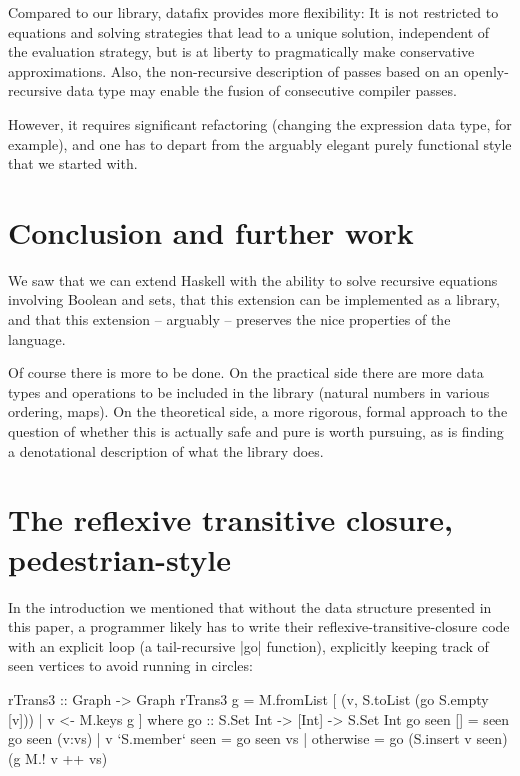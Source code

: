 \documentclass[manuscript,screen,acmsmall,nonacm]{acmart}
\begin{document}
Compared to our library, datafix provides more flexibility: It is not restricted to equations and solving strategies that lead to a unique solution, independent of the evaluation strategy, but is at liberty to pragmatically make conservative approximations. Also, the non-recursive description of passes based on an openly-recursive data type may enable the fusion of consecutive compiler passes.

However, it requires significant refactoring (changing the expression data type, for example), and one has to depart from the arguably elegant purely functional style that we started with.

\section{Conclusion and further work}

We saw that we can extend Haskell with the ability to solve recursive equations involving Boolean and sets, that this extension can be implemented as a library, and that this extension -- arguably -- preserves the nice properties of the language.

Of course there is more to be done. On the practical side there are more data types and operations to be included in the library (natural numbers in various ordering, maps). On the theoretical side, a more rigorous, formal approach to the question of whether this is actually safe and pure is worth pursuing, as is finding a denotational description of what the library does.




\clearpage

\appendix
\section{The reflexive transitive closure, pedestrian-style}\label{sec:imp}

In the introduction we mentioned that without the data structure presented in this paper, a programmer likely has to write their reflexive-transitive-closure code with an explicit loop (a tail-recursive |go| function), explicitly keeping track of seen vertices to avoid running in circles:
\begin{code}
rTrans3 :: Graph -> Graph
rTrans3 g = M.fromList [ (v, S.toList (go S.empty [v])) | v <- M.keys g ]
  where
    go :: S.Set Int -> [Int] -> S.Set Int
    go seen [] = seen
    go seen (v:vs)  |  v `S.member` seen  =  go seen vs
                    |  otherwise          =  go (S.insert v seen) (g M.! v ++ vs)
\end{code}
\end{document}
